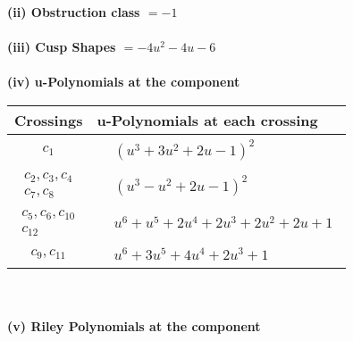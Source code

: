 \documentclass[1p]{elsarticle_modified}
\theoremstyle{definition}
\begin{document}
\flushleft \textbf{(ii) Obstruction class $= -1$}\\~\\
\flushleft \textbf{(iii) Cusp Shapes $= -4 u^2-4 u-6$}\\~\\
\newpage\renewcommand{\arraystretch}{1}
\flushleft \textbf{(iv) u-Polynomials at the component}\newline \\
\begin{tabular}{m{50pt}|m{274pt}}
Crossings & \hspace{64pt}u-Polynomials at each crossing \\
\hline $$\begin{aligned}c_{1}\end{aligned}$$&$\begin{aligned}
&(u^3+3 u^2+2 u-1)^2
\end{aligned}$\\
\hline $$\begin{aligned}c_{2},c_{3},c_{4}\\c_{7},c_{8}\end{aligned}$$&$\begin{aligned}
&(u^3- u^2+2 u-1)^2
\end{aligned}$\\
\hline $$\begin{aligned}c_{5},c_{6},c_{10}\\c_{12}\end{aligned}$$&$\begin{aligned}
&u^6+u^5+2 u^4+2 u^3+2 u^2+2 u+1
\end{aligned}$\\
\hline $$\begin{aligned}c_{9},c_{11}\end{aligned}$$&$\begin{aligned}
&u^6+3 u^5+4 u^4+2 u^3+1
\end{aligned}$\\
\hline
\end{tabular}\\~\\
\newpage\renewcommand{\arraystretch}{1}
\flushleft \textbf{(v) Riley Polynomials at the component}\newline \\
\end{document}

